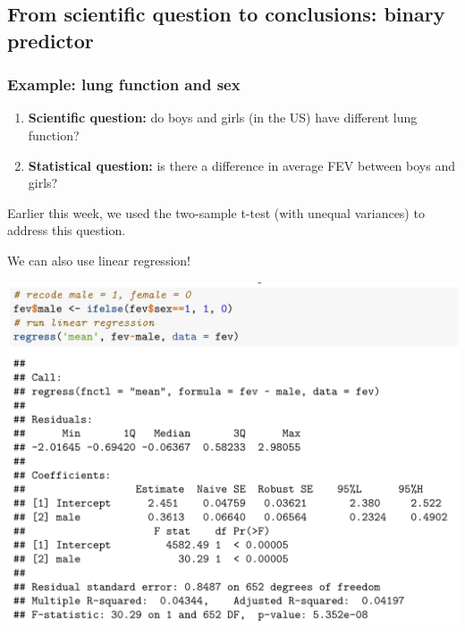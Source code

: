 \documentclass[12pt, 
hyperref={colorlinks=true, linkcolor=blue, urlcolor=cyan}]{beamer}
\begin{document}
\subsection{From scientific question to conclusions: binary predictor}
\begin{frame}
\frametitle{Example: lung function and sex}

\begin{enumerate}
\item \textbf{Scientific question:} do boys and girls (in the US) have different lung function?
\item \textbf{Statistical question:} is there a difference in average FEV between boys and girls?
\end{enumerate} 

Earlier this week, we used the two-sample t-test (with unequal variances) to address this question.

We can also use linear regression!
\end{frame}

\begin{frame}
\hspace*{-0.5cm} \includegraphics[width=0.9\paperwidth]{./plots/regress_fev_vs_sex} %
\end{frame}
\end{document}
